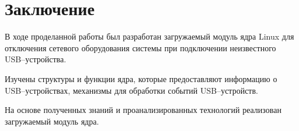 \chapter*{Заключение}

В ходе проделанной работы был разработан загружаемый модуль ядра Linux для отключения сетевого оборудования системы при подключении неизвестного USB--устройства.

Изучены структуры и функции ядра, которые предоставляют информацию о USB--устройствах, механизмы для обработки событий USB--устройств. 

На основе полученных знаний и проанализированных технологий реализован загружаемый модуль ядра.